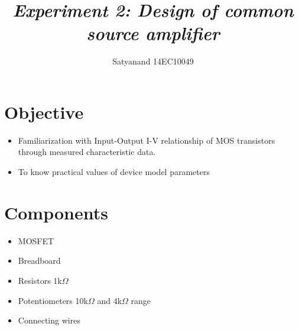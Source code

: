 \title{{\it \textbf{Experiment 2:\hspace{0.5cm} Design of common source amplifier}\/} } 




\author
{Satyanand 14EC10049\\
}


\date{}






 


\baselineskip14pt










\renewcommand{\baselinestretch}{0.5} 

\section*{Objective}
\begin{itemize}
    \item Familiarization with Input-Output I-V relationship of MOS transistors through measured characteristic data.
    \item To know practical values of device model parameters
\end{itemize}


\section*{Components}
\begin{itemize}
    \item MOSFET
    \item Breadboard%
    \item Resistors 1k$\Omega$
    \item Potentiometers 10k$\Omega$ and  4k$\Omega$  range
    \item Connecting wires
\end{itemize}

